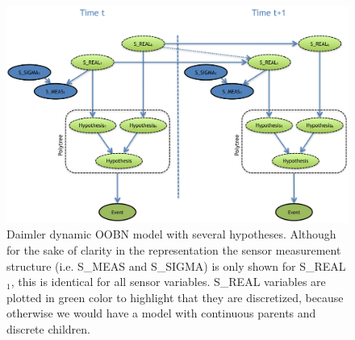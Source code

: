 \begin{figure}[ht!]
\begin{center}
\includegraphics[scale=0.39]{./figures/DaimlerLEdynGeneric}
\end{center}
\caption{\label{Figure:daimlerLEdynGeneric}Daimler dynamic OOBN model with several hypotheses. Although for the sake of clarity in the representation the sensor measurement structure (i.e. S\_MEAS and S\_SIGMA) is only shown for S\_REAL$_1$, this is identical for all sensor variables. S\_REAL variables are plotted in green color to highlight that they are discretized, because otherwise we would have a model with continuous parents and discrete children.}
\end{figure}


